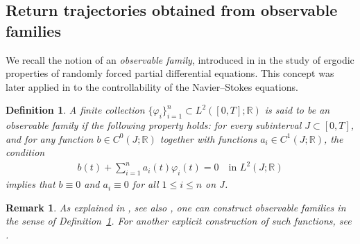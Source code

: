\documentclass[10pt, reqno]{amsart}
\newtheorem{definition}{Definition}
\numberwithin{equation}{section}
\newtheorem{remark}{Remark}
\begin{document}
\subsection{Return trajectories obtained from observable families} We recall the notion of an \emph{observable family}, introduced in \cite{Kuksin_Nersesyan_Shirikyan_2020} in the study of ergodic properties of randomly forced partial differential equations. This concept was later applied in \cite{Nersesyan_2021_Sicon} to the controllability of the Navier--Stokes equations.
\begin{definition}\label{defn_Observable_family}
A finite collection \( \{ \varphi_i \}_{i=1}^n \subset L^2([0, T]; \mathbb{R}) \) is said to be an \textit{observable family} if the following property holds: for every subinterval \( J \subset [0, T] \), and for any function \( b \in C^0(J; \mathbb{R}) \) together with functions \( a_i \in C^1(J; \mathbb{R}) \), the condition
\begin{align}\label{observable_cndn}
b(t) + \sum_{i=1}^n a_i(t) \varphi_i(t) = 0 \quad \text{in } L^2(J; \mathbb{R})
\end{align}
implies that \( b \equiv 0 \) and \( a_i \equiv 0 \) for all \( 1 \le i \le n \) on \( J \).
\end{definition}
\begin{remark}
As explained in \cite[Section 3.3]{Nersesyan_2021_Sicon}, see also \cite{Kuksin_Nersesyan_Shirikyan_2020}, one can construct observable families in the sense of Definition~\ref{defn_Observable_family}. For another explicit construction of such functions, see \cite[Remark 4.31]{Rudin_analysis_book}.
\end{remark}
\end{document}
